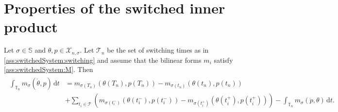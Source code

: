 \documentclass[reqno]{amsart}
\newcommand{\X}{{\mathscr X}}
\newcommand{\timeInt}{\mathbb{T}}
\newcommand{\state}{\theta}
\newcommand{\adState}{p}
\newcommand{\dt}{\,\mathrm{d}t}
\newcommand{\switch}{\sigma}
\newcommand{\addSwitching}{\mathbb{S}}
\newcommand{\calT}{\mathcal{T}}
\begin{document}



\appendix
\section{Properties of the switched inner product}
%
\begin{lemma}\label{lemma:S-IBP}
    Let $\switch\in\addSwitching$ and $\state,\adState\in \X_{n,\switch}$. Let $\calT_n$ be the set of switching times as in \,\ref{ass:switchedSystem:switching} and assume that the bilinear forms $m_i$ satisfy \,\ref{ass:switchedSystem:M}. Then
    \begin{align}    \label{eqn:integrationByPartsM}
    \begin{aligned}
        \int_{\timeInt_n} m_{\switch}(\dot{\state},\adState)\dt &=  m_{\switch(T_n)}(\state(T_{n}),\adState(T_{n}))-m_{\switch(t_n)}(\state(t_{n}),\adState(t_{n}))\\
        &+\sum_{t_i\in \calT} \left(m_{\switch(t^-_i)}(\state(t^-_{i}),\adState(t^-_{i}))-m_{\switch(t^+_i)}(\state(t_{i}^+),\adState(t^+_{i}))\right) -\int_{\timeInt_n} m_{\switch}(\dot{\adState},\state)\dt .
        \end{aligned}
    \end{align}
\end{lemma}
\end{document}
